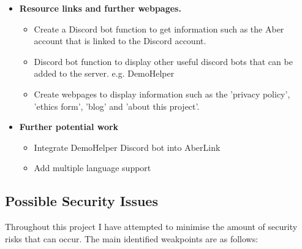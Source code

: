 \begin{itemize}
	\item \textbf{Resource links and further webpages.} 
	\begin{itemize}
		\item Create a Discord bot function to get information such as the Aber account that is linked to the Discord account.
		\item Discord bot function to display other useful discord bots that can be added to the server. e.g. DemoHelper \cite {demohelper}
		\item Create webpages to display information such as the 'privacy policy', 'ethics form', 'blog' and 'about this project'.
	\end{itemize}
	
	\item \textbf{Further potential work}
	\begin{itemize}
		\item Integrate DemoHelper Discord bot into AberLink
		\item Add multiple language support
	\end{itemize}
\end{itemize}

\subsection{Possible Security Issues}
Throughout this project I have attempted to minimise the amount of security risks that can occur. The main identified weakpoints are as follows:

